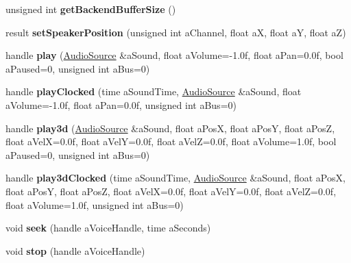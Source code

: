 \begin{DoxyCompactItemize}
unsigned int {\bfseries get\+Backend\+Buffer\+Size} ()
\item 
\mbox{\label{class_so_loud_1_1_soloud_a1835694c29ac4ce0ea9e4bcaf7ef3373}} 
result {\bfseries set\+Speaker\+Position} (unsigned int a\+Channel, float aX, float aY, float aZ)
\item 
\mbox{\label{class_so_loud_1_1_soloud_abd8f5c6c7f1ee00ed340d09302448a9a}} 
handle {\bfseries play} (\mbox{\hyperlink{class_so_loud_1_1_audio_source}{Audio\+Source}} \&a\+Sound, float a\+Volume=-\/1.\+0f, float a\+Pan=0.\+0f, bool a\+Paused=0, unsigned int a\+Bus=0)
\item 
\mbox{\label{class_so_loud_1_1_soloud_a371446b6bf287a9e10514dd9b113111b}} 
handle {\bfseries play\+Clocked} (time a\+Sound\+Time, \mbox{\hyperlink{class_so_loud_1_1_audio_source}{Audio\+Source}} \&a\+Sound, float a\+Volume=-\/1.\+0f, float a\+Pan=0.\+0f, unsigned int a\+Bus=0)
\item 
\mbox{\label{class_so_loud_1_1_soloud_aec0c42f795c8213606ce885c45d9e4e8}} 
handle {\bfseries play3d} (\mbox{\hyperlink{class_so_loud_1_1_audio_source}{Audio\+Source}} \&a\+Sound, float a\+PosX, float a\+PosY, float a\+PosZ, float a\+VelX=0.\+0f, float a\+Vel\+Y=0.\+0f, float a\+Vel\+Z=0.\+0f, float a\+Volume=1.\+0f, bool a\+Paused=0, unsigned int a\+Bus=0)
\item 
\mbox{\label{class_so_loud_1_1_soloud_a5d1e394c21dc42b8e6f0a1e6a827228c}} 
handle {\bfseries play3d\+Clocked} (time a\+Sound\+Time, \mbox{\hyperlink{class_so_loud_1_1_audio_source}{Audio\+Source}} \&a\+Sound, float a\+PosX, float a\+PosY, float a\+PosZ, float a\+VelX=0.\+0f, float a\+Vel\+Y=0.\+0f, float a\+Vel\+Z=0.\+0f, float a\+Volume=1.\+0f, unsigned int a\+Bus=0)
\item 
\mbox{\label{class_so_loud_1_1_soloud_afef203ec579c25b59d9d2bc83692d7cc}} 
void {\bfseries seek} (handle a\+Voice\+Handle, time a\+Seconds)
\item 
\mbox{\label{class_so_loud_1_1_soloud_a04712e8863bb2a1078251f91d4a6d776}} 
void {\bfseries stop} (handle a\+Voice\+Handle)
\item 

\end{DoxyCompactItemize}
